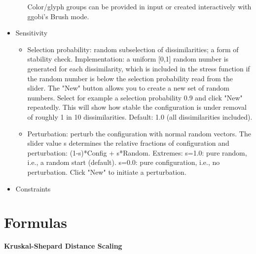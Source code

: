 \documentclass[11pt]{article}
\begin{document}
\begin{itemize}
\begin{itemize}
    Color/glyph groups can be provided in input
    or created interactively with ggobi's Brush mode.
  \end{itemize}

\item Sensitivity
\begin{itemize}
\item
Selection probability: random subselection of dissimilarities; a form
   of stability check.  Implementation: a uniform [0,1] random number
   is generated for each dissimilarity, which is included in the
   stress function if the random number is below the selection
   probability read from the slider.  The "New" button allows you to
   create a new set of random numbers.  Select for example a selection
   probability 0.9 and click "New" repeatedly.  This will show how
   stable the configuration is under removal of roughly 1 in 10
   dissimilarities.  Default: 1.0 (all dissimilarities included).
\item
Perturbation: perturb the configuration with normal random vectors.
   The slider value s determines the relative fractions of
   configuration and perturbation: (1-s)*Config + s*Random.  
   Extremes: s=1.0: pure random, i.e., a random start (default).  
             s=0.0: pure configuration, i.e., no perturbation.
   Click "New" to initiate a perturbation.
\end{itemize}

\item Constraints

\end{itemize}



\section{Formulas}


\begin{center}
{\Large \bf Kruskal-Shepard Distance Scaling}
\end{center}
\end{document}
